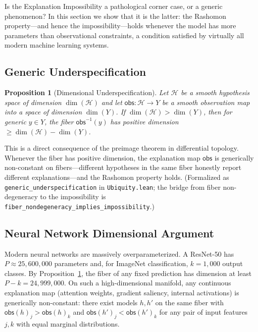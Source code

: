\documentclass[11pt,a4paper]{article}
\newtheorem{proposition}[theorem]{Proposition}
\newcommand{\sH}{\mathcal{H}}
\begin{document}
Is the Explanation Impossibility a pathological corner case, or a
generic phenomenon?  In this section we show that it is the latter: the
Rashomon property---and hence the impossibility---holds whenever the model
has more parameters than observational constraints, a condition satisfied by
virtually all modern machine learning systems.

\subsection{Generic Underspecification}
\label{sec:generic-underspec}

\begin{proposition}[Dimensional Underspecification]
\label{prop:generic-underspec}
Let $\sH$ be a smooth hypothesis space of dimension $\dim(\sH)$ and let
$\mathsf{obs} : \sH \to Y$ be a smooth observation map into a space of
dimension $\dim(Y)$.  If $\dim(\sH) > \dim(Y)$, then for generic
$y \in Y$, the fiber $\mathsf{obs}^{-1}(y)$ has positive dimension
$\geq \dim(\sH) - \dim(Y)$.
\end{proposition}

\noindent
This is a direct consequence of the preimage theorem in differential
topology.  Whenever the fiber has positive dimension, the explanation map
$\mathsf{obs}$ is generically non-constant on fibers---different hypotheses
in the same fiber honestly report different explanations---and the Rashomon
property holds.  (Formalized as \texttt{generic\_underspecification} in
\texttt{Ubiquity.lean}; the bridge from fiber non-degeneracy to the
impossibility is \texttt{fiber\_nondegeneracy\_implies\_impossibility}.)

\subsection{Neural Network Dimensional Argument}
\label{sec:nn-dimensional}

Modern neural networks are massively overparameterized.  A ResNet-50 has
$P \approx 25{,}600{,}000$ parameters and, for ImageNet classification,
$k = 1{,}000$ output classes.  By Proposition~\ref{prop:generic-underspec},
the fiber of any fixed prediction has dimension at least
$P - k = 24{,}999{,}000$.  On such a high-dimensional manifold, any
continuous explanation map (attention weights, gradient saliency, internal
activations) is generically non-constant: there exist models $h, h'$ on the
same fiber with $\mathsf{obs}(h)_j > \mathsf{obs}(h)_k$ and
$\mathsf{obs}(h')_j < \mathsf{obs}(h')_k$ for any pair of input features
$j, k$ with equal marginal distributions.
\end{document}
